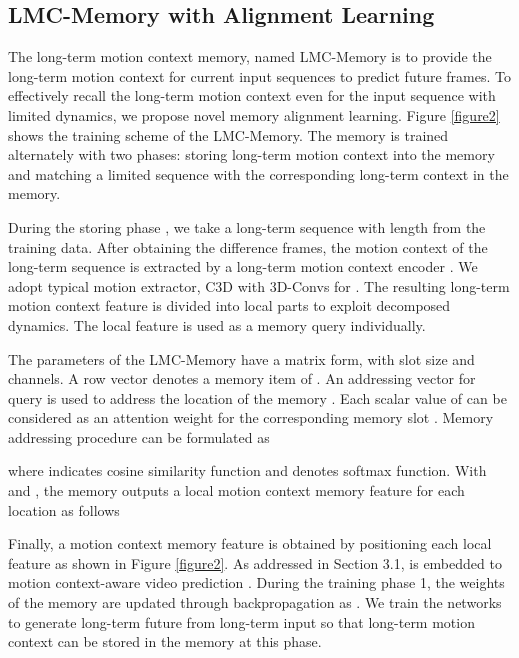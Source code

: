 \documentclass[final]{cvpr}
\begin{document}
\subsection{LMC-Memory with Alignment Learning}
The long-term motion context memory, named LMC-Memory is to provide the long-term motion context for current input sequences to predict future frames. To effectively recall the long-term motion context even for the input sequence with limited dynamics, we propose novel memory alignment learning. Figure \ref{figure2} shows the training scheme of the LMC-Memory. The memory is trained alternately with two phases:  storing long-term motion context into the memory and  matching a limited sequence with the corresponding long-term context in the memory.

During the storing phase , we take a long-term sequence  with length  from the training data. After obtaining the difference frames, the motion context of the long-term sequence is extracted by a long-term motion context encoder . We adopt typical motion extractor, C3D \cite{tran2015learning} with 3D-Convs for . The resulting long-term motion context feature  is divided into local parts to exploit decomposed dynamics. The local feature  is used as a memory query individually.

The parameters of the LMC-Memory have a matrix form,  with  slot size and  channels. A row vector  denotes a memory item of . An addressing vector  for query  is used to address the location of the memory . Each scalar value  of  can be considered as an attention weight for the corresponding memory slot . Memory addressing procedure can be formulated as

where  indicates cosine similarity function and  denotes softmax function. With  and , the memory outputs a local motion context memory feature   for each location  as follows 

Finally, a motion context memory feature  is obtained by positioning each local feature  as shown in Figure \ref{figure2}. As addressed in Section 3.1,  is embedded to motion context-aware video prediction . During the training phase 1, the weights of the memory  are updated through backpropagation as \cite{gong2019memorizing}. We train the networks to generate long-term future from long-term input so that long-term motion context can be stored in the memory at this phase.
\end{document}
